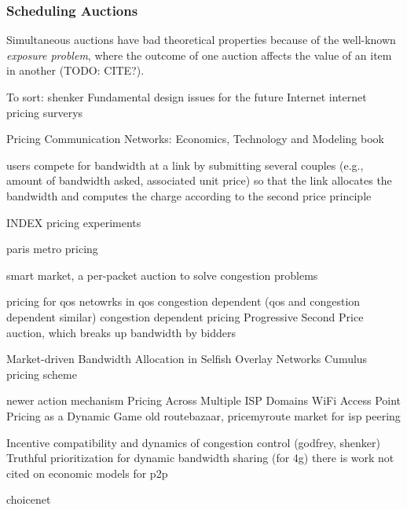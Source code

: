 \subsubsection{Scheduling Auctions}
Simultaneous auctions have bad theoretical properties because of the well-known \emph{exposure problem}, where the outcome of one auction affects the value of an item in another (TODO: CITE?).


To sort:
shenker Fundamental design issues for the future Internet \cite{shenker95}
internet pricing surverys\cite{stiller01, falkner00, odlyzko01}

Pricing Communication Networks: Economics, Technology and Modeling book \cite{courcoubetis03}

users compete for bandwidth at a link by submitting several couples (e.g., amount of bandwidth asked, associated unit price) so that the link allocates the bandwidth and computes the charge according to the second price principle \cite{maille06}


INDEX pricing experiments \cite{altmann99, edell99}

paris metro pricing \cite{odlyzko99}

smart market, a per-packet auction to solve congestion problems

pricing for qos netowrks \cite{dasilva00, marbach04}
in qos congestion dependent (qos and congestion dependent similar) \cite{shu03}
congestion dependent pricing \cite{mason95, peha97, paschalidis00, la00, la02}
Progressive Second Price auction, which breaks up bandwidth by bidders  \cite{lazar98, lazar99, semret99, semret00,maille03, bitsaki05, beltran07}

Market-driven Bandwidth Allocation in Selfish Overlay Networks \cite{wang05}
Cumulus pricing scheme \cite{reichl01, stiller01cumulus, reichl01edgepricing, reichl03, hayel05}

newer action mechanism \cite{dramitinos07}
Pricing Across Multiple ISP Domains \cite{saberi07}
WiFi Access Point Pricing as a Dynamic Game \cite{musacchio06}
old routebazaar, pricemyroute \cite{esquivel09, pricemyroute11}
market for isp peering \cite{hau09}

Incentive compatibility and dynamics of congestion control (godfrey, shenker) \cite{godfrey10}
Truthful prioritization for dynamic bandwidth sharing (for 4g) \cite{shnayder14}
there is work not cited on economic models for p2p

choicenet \cite{wolf14}
